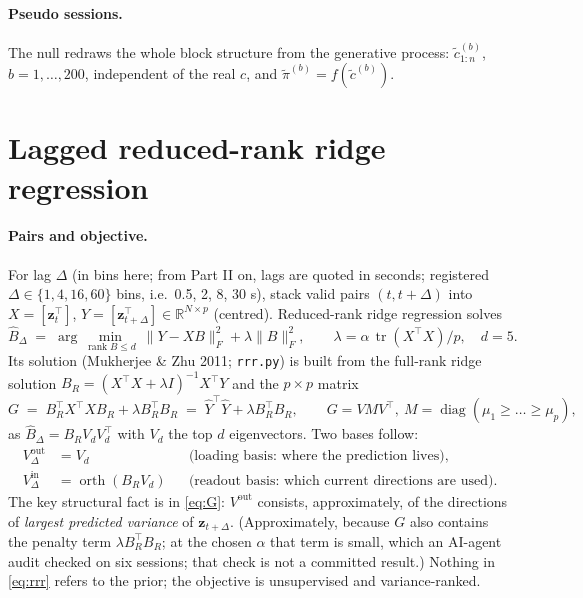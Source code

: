 \documentclass[11pt]{article}
\newcommand{\R}{\mathbb{R}}
\newcommand{\tr}{\operatorname{tr}}
\newcommand{\orth}{\operatorname{orth}}
\newcommand{\rank}{\operatorname{rank}}
\begin{document}
\paragraph{Pseudo sessions.} The null redraws the whole block structure from the generative process:
$\tilde c^{(b)}_{1:n}$, $b = 1, \dots, 200$, independent of the real $c$, and $\tilde\pi^{(b)} = f(\tilde c^{(b)})$.

\section{Lagged reduced-rank ridge regression}

\paragraph{Pairs and objective.} For lag $\Delta$ (in bins here; from Part II on, lags are quoted in seconds;
registered $\Delta \in \{1, 4, 16, 60\}$ bins, i.e.\ 0.5, 2, 8, 30 s), stack valid pairs $(t, t+\Delta)$ into $X = [\bm z_t^\top]$, $Y = [\bm z_{t+\Delta}^\top] \in \R^{N\times p}$
(centred). Reduced-rank ridge regression solves
\begin{equation}
\hat B_\Delta \;=\; \arg\min_{\rank B \le d}\ \|Y - XB\|_F^2 + \lambda \|B\|_F^2,
\qquad \lambda = \alpha\, \tr(X^\top X)/p, \quad d = 5.
\label{eq:rrr}
\end{equation}
Its solution (Mukherjee \& Zhu 2011; \texttt{rrr.py}) is built from the full-rank ridge solution
$B_R = (X^\top X + \lambda I)^{-1} X^\top Y$ and the $p\times p$ matrix
\begin{equation}
G \;=\; B_R^\top X^\top X B_R + \lambda B_R^\top B_R \;=\; \hat Y^\top \hat Y + \lambda B_R^\top B_R,
\qquad G = V M V^\top,\ M = \operatorname{diag}(\mu_1 \ge \dots \ge \mu_p),
\label{eq:G}
\end{equation}
as $\hat B_\Delta = B_R V_d V_d^\top$ with $V_d$ the top $d$ eigenvectors. Two bases follow:
\begin{align}
V^{\mathrm{out}}_\Delta &= V_d && \text{(loading basis: where the prediction lives)},\\
V^{\mathrm{in}}_\Delta &= \orth(B_R V_d) && \text{(readout basis: which current directions are used)}.
\end{align}
The key structural fact is in \eqref{eq:G}: $V^{\mathrm{out}}$ consists, approximately, of the directions of
\emph{largest predicted variance} of $\bm z_{t+\Delta}$. (Approximately, because $G$ also contains the penalty term
$\lambda B_R^\top B_R$; at the chosen $\alpha$ that term is small, which an AI-agent audit checked on six sessions;
that check is not a committed result.) Nothing in \eqref{eq:rrr} refers to the prior; the objective is unsupervised
and variance-ranked.
\end{document}
